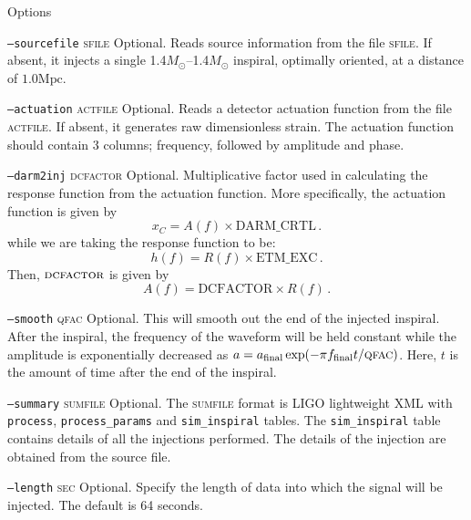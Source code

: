 \begin{entry}
\item[Options]\leavevmode
\begin{entry}
\item[\texttt{--sourcefile} \textsc{sfile}] Optional.  Reads source information 
from the file \textsc{sfile}.  If absent, it injects a single 
1.4$M_\odot$--1.4$M_\odot$ inspiral, optimally oriented, at a distance
of $1.0 \textrm{Mpc}$.

\item[\texttt{--actuation} \textsc{actfile}] Optional. Reads a detector
 actuation function from the file \textsc{actfile}.  If absent, it generates 
raw dimensionless strain.  The actuation function should contain 3 columns; frequency, followed by amplitude and phase. 


\item[\texttt{--darm2inj} \textsc{dcfactor}] Optional.  Multiplicative
factor used in calculating the response function from the actuation
function.  More specifically, the actuation function is given by 
%
\begin{equation}
   x_{C} = A(f) \times \mathrm{DARM}\_\mathrm{CRTL} \, .
\end{equation}
%
while we are taking the response function to be:
%
\begin{equation}
   h(f) = R(f) \times \mathrm{ETM}\_\mathrm{EXC} \, .
\end{equation}
%
Then, $\textsc{dcfactor}$ is given by
%
\begin{equation}
   A(f) = \mathrm{DCFACTOR} \times R(f) \, .
\end{equation}

\item[\texttt{--smooth} \textsc{qfac}]  Optional.  This will smooth out
the end of the injected inspiral.  After the inspiral, the frequency of
the waveform will be held constant while the amplitude is exponentially
decreased as $a = a_{\mathrm{final}} \exp(- \pi f_{\mathrm{final}} t /
\textsc{qfac})$.  Here, $t$ is the amount of time after the end of the
inspiral.

\item[\texttt{--summary} \textsc{sumfile}] Optional. The \textsc{sumfile} format
is LIGO lightweight XML with \texttt{process}, \texttt{process\_params} and
\texttt{sim\_inspiral} tables.  The \texttt{sim\_inspiral} table contains
details of all the injections performed.  The details of the injection are
obtained from the source file.

\item[\texttt{--length} \textsc{sec}] Optional.  Specify the length of data into
which the signal will be injected.  The default is 64 seconds.


\end{entry}
\end{entry}
